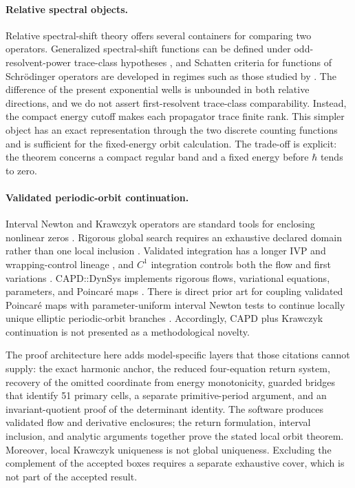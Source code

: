 \paragraph{Relative spectral objects.}
Relative spectral-shift theory offers several containers for comparing two
operators.  Generalized spectral-shift functions can be defined under
odd-resolvent-power trace-class hypotheses \citep{Yafaev2005}, and Schatten
criteria for functions of Schr\"odinger operators are developed in regimes
such as those studied by \citet{FrankPushnitski2019}.  The difference of the
present exponential wells is unbounded in both relative directions, and we
do not assert first-resolvent trace-class comparability.  Instead, the
compact energy cutoff makes each propagator trace finite rank.  This simpler
object has an exact representation through the two discrete counting
functions and is sufficient for the fixed-energy orbit calculation.  The
trade-off is explicit: the theorem concerns a compact regular band and a
fixed energy before \(\hbar\) tends to zero.

\paragraph{Validated periodic-orbit continuation.}
Interval Newton and Krawczyk operators are standard tools for enclosing
nonlinear zeros
\citep{Krawczyk1969,Neumaier1990,MooreKearfottCloud2009,Rump2010}.  Rigorous
global search requires an exhaustive declared domain rather than one local
inclusion \citep{Kearfott1996}.  Validated integration has a longer IVP and
wrapping-control lineage \citep{Lohner1987,NedialkovJacksonCorliss1999}, and
\(C^1\) integration controls both the flow and first variations
\citep{Zgliczynski2002}.  CAPD::DynSys implements rigorous flows,
variational equations, parameters, and Poincar\'e maps
\citep{KapelaMrozekWilczakZgliczynski2021,KapelaWilczakZgliczynski2022}.
There is direct prior art for coupling validated Poincar\'e maps with
parameter-uniform interval Newton tests to continue locally unique elliptic
periodic-orbit branches
\citep{WilczakZgliczynski2009,BarrioRodriguez2014,WilczakBarrio2017}.
Accordingly, CAPD plus
Krawczyk continuation is not presented as a methodological novelty.

The proof architecture here adds model-specific layers that those citations
cannot supply: the exact harmonic anchor, the reduced four-equation return
system, recovery of the omitted coordinate from energy monotonicity, guarded
bridges that identify 51 primary cells, a separate primitive-period argument,
and an invariant-quotient proof of the determinant identity.  The software
produces validated flow and derivative enclosures; the return formulation,
interval inclusion, and analytic arguments together prove the stated local
orbit theorem.  Moreover, local Krawczyk uniqueness is not global
uniqueness.  Excluding the complement of the accepted boxes requires a
separate exhaustive cover, which is not part of the accepted result.

